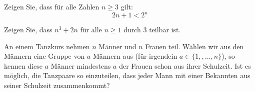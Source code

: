 \begin{aufgabe}\label{logik_aufgabe_7} Zeigen Sie, dass für alle Zahlen $n \geq 3$ gilt:
  $$ 2n + 1 < 2^n $$
\end{aufgabe}

\begin{aufgabe}\label{logik_aufgabe_8} Zeigen Sie, dass $n^3 + 2n$ für alle $n \geq 1$ durch $3$ teilbar ist.
\end{aufgabe}


\begin{aufgabe} An einem Tanzkurs nehmen  $n$ Männer und $n$ Frauen teil. Wählen wir aus den Männern 
eine Gruppe von $a$ Männern aus (für irgendein $a \in \{ 1, , \ldots, n\}$), so kennen diese $a$ Männer 
mindestens $a$ der Frauen schon aus ihrer Schulzeit. Ist es möglich, die Tanzpaare so einzuteilen, dass 
jeder Mann mit einer Bekannten aus seiner Schulzeit zusammenkommt? 
\end{aufgabe}
